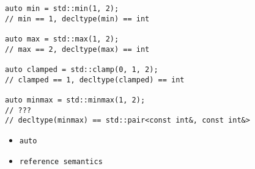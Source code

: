 \documentclass{beamer}
\begin{document}
\begin{frame}
\begin{verbatim}
auto min = std::min(1, 2);
// min == 1, decltype(min) == int

auto max = std::max(1, 2);
// max == 2, decltype(max) == int

auto clamped = std::clamp(0, 1, 2);
// clamped == 1, decltype(clamped) == int

auto minmax = std::minmax(1, 2);
// ???
// decltype(minmax) == std::pair<const int&, const int&>
\end{verbatim}
\end{frame}

\begin{frame}
\begin{itemize}
    \item \texttt{auto}
    \item \texttt{reference semantics}
\end{itemize}
\end{frame}
\end{document}
